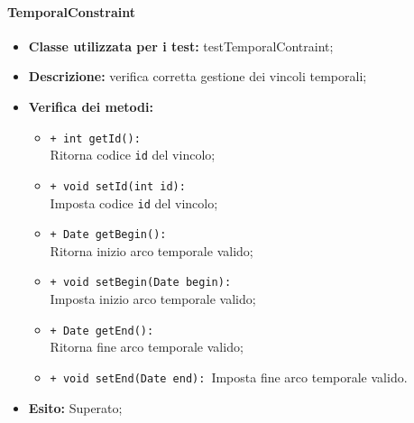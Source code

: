 \paragraph{TemporalConstraint}
\begin{flushleft}
\begin{itemize}
\item \textbf{Classe utilizzata per i test:} testTemporalContraint;
\item \textbf{Descrizione:} verifica corretta gestione dei vincoli temporali;
\item \textbf{Verifica dei metodi:}
\begin{sloppypar}
\begin{itemize}
\item \texttt{+ int getId():}\\ Ritorna codice \texttt{id} del vincolo;
\item \texttt{+ void setId(int id):}\\ Imposta codice \texttt{id} del vincolo;
\item \texttt{+ Date getBegin():}\\ Ritorna inizio arco temporale valido;
\item \texttt{+ void setBegin(Date begin):}\\ Imposta inizio arco temporale valido;
\item \texttt{+ Date getEnd():}\\ Ritorna fine arco temporale valido;
\item \texttt{+ void setEnd(Date end):}\ Imposta fine arco temporale valido.
\end{itemize}
\end{sloppypar}
\item \textbf{Esito:} Superato;
\end{itemize}
\end{flushleft}

